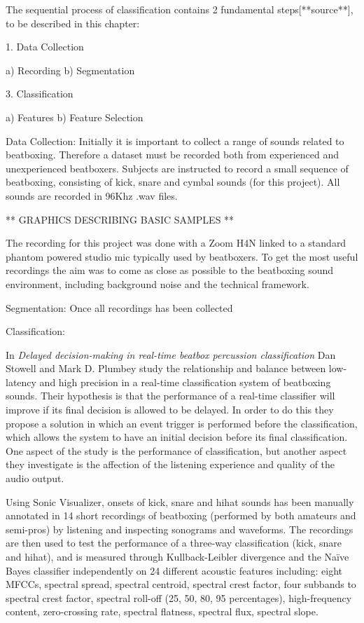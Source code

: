 The sequential process of classification contains 2 fundamental steps[**source**], to be described in this chapter: 

1.	Data Collection

	a)	Recording
	b)	Segmentation
	
3. Classification

	a)	Features
	b)	Feature Selection

Data Collection: 
Initially it is important to collect a range of sounds related to beatboxing. Therefore a dataset must be recorded both from experienced and unexperienced beatboxers. Subjects are instructed to record a small sequence of beatboxing, consisting of kick, snare and cymbal sounds (for this project). All sounds are recorded in 96Khz .wav files. 

** GRAPHICS DESCRIBING BASIC SAMPLES ** 

The recording for this project was done with a Zoom H4N linked to a standard phantom powered studio mic typically used by beatboxers. To get the most useful recordings the aim was to come as close as possible to the beatboxing sound environment, including background noise and the technical framework.


Segmentation:
Once all recordings has been collected

Classification: 

In \textit{Delayed decision-making in real-time beatbox percussion classification} Dan Stowell and Mark D. Plumbey study the relationship and balance between low-latency and high precision in a real-time classification system of beatboxing sounds. Their hypothesis is that the performance of a real-time classifier will improve if its final decision is allowed to be delayed. 
In order to do this they propose a solution in which an event trigger is performed before the classification, which allows the system to have an initial decision before its final classification. One aspect of the study is the performance of classification, but another aspect they investigate is the affection of the listening experience and quality of the audio output. 

Using Sonic Visualizer, onsets of kick, snare and hihat sounds has been manually annotated in 14 short recordings of beatboxing (performed by both amateurs and semi-pros) by listening and inspecting sonograms and waveforms. The recordings are then used to test the performance of a three-way classification (kick, snare and hihat), and is measured through Kullback-Leibler divergence and the Naïve Bayes classifier independently on 24 different acoustic features including: eight MFCCs, spectral spread, spectral centroid, spectral crest factor, four subbands to spectral crest factor, spectral roll-off (25, 50, 80, 95 percentages), high-frequency content, zero-crossing rate, spectral flatness, spectral flux, spectral slope.

